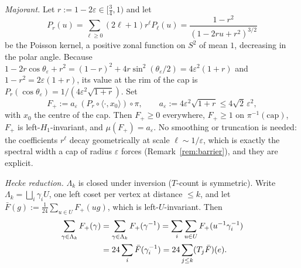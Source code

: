 \documentclass[aps,prx,twocolumn,superscriptaddress,nofootinbib,longbibliography]{revtex4-2}
\theoremstyle{plain}
\theoremstyle{definition}
\theoremstyle{remark}
\begin{document}
\emph{Majorant.} Let $r:=1-2\varepsilon\in[\tfrac34,1)$ and let
\begin{equation}
P_r(u)=\sum_{\ell\ge0}(2\ell+1)r^\ell P_\ell(u)=\frac{1-r^2}{(1-2ru+r^2)^{3/2}}
\end{equation}
be the Poisson kernel, a positive zonal function on $S^2$ of mean $1$, decreasing in the polar angle. Because $1-2r\cos\theta_\varepsilon+r^2=(1-r)^2+4r\sin^2(\theta_\varepsilon/2)=4\varepsilon^2(1+r)$ and $1-r^2=2\varepsilon(1+r)$, its value at the rim of the cap is $P_r(\cos\theta_\varepsilon)=1/(4\varepsilon^2\sqrt{1+r})$. Set
\begin{equation}
F_+:=a_\varepsilon\,(P_r\circ\langle\cdot,x_0\rangle)\circ\pi,\qquad a_\varepsilon:=4\varepsilon^2\sqrt{1+r}\le4\sqrt2\,\varepsilon^2,
\end{equation}
with $x_0$ the centre of the cap. Then $F_+\ge0$ everywhere, $F_+\ge1$ on $\pi^{-1}(\mathrm{cap})$, $F_+$ is left-$H_1$-invariant, and $\mu(F_+)=a_\varepsilon$. No smoothing or truncation is needed: the coefficients $r^\ell$ decay geometrically at scale $\ell\sim1/\varepsilon$, which is exactly the spectral width a cap of radius $\varepsilon$ forces (Remark~\ref{rem:barrier}), and they are explicit.

\emph{Hecke reduction.} $\Lambda_k$ is closed under inversion ($T$-count is symmetric). Write $\Lambda_k=\bigsqcup_i\gamma_iU$, one left coset per vertex at distance $\le k$, and let $\bar F(g):=\frac1{24}\sum_{u\in U}F_+(ug)$, which is left-$U$-invariant. Then
\begin{align}
\sum_{\gamma\in\Lambda_k}F_+(\gamma)&=\sum_{\gamma\in\Lambda_k}F_+(\gamma^{-1})=\sum_i\sum_{u\in U}F_+(u^{-1}\gamma_i^{-1})\notag\\
&=24\sum_i\bar F(\gamma_i^{-1})=24\sum_{j\le k}(T_j\bar F)(e).
\end{align}
\end{document}
